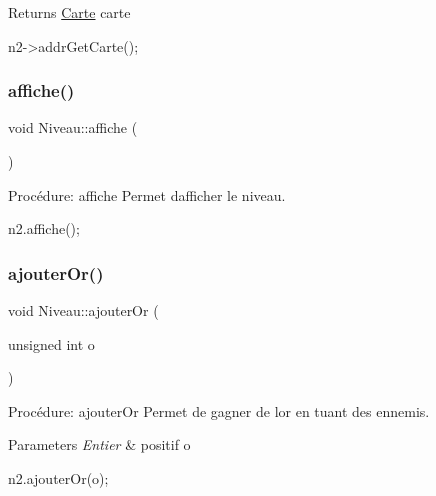 \begin{DoxyReturn}{Returns}
\hyperlink{classCarte}{Carte} carte 
\begin{DoxyCode}
n2->addrGetCarte();
\end{DoxyCode}
 
\end{DoxyReturn}
\mbox{\label{classNiveau_a945a71fd635f9ab1e15dbae04afa5e5d}} 
\subsubsection{\texorpdfstring{affiche()}{affiche()}}
{\footnotesize\ttfamily void Niveau\+::affiche (\begin{DoxyParamCaption}{ }\end{DoxyParamCaption})}



Procédure\+: affiche Permet d\textquotesingle{}afficher le niveau. 


\begin{DoxyCode}
n2.affiche();
\end{DoxyCode}
 \mbox{\label{classNiveau_aca63b4ff95491069ebf5a8931ffc6d03}} 
\subsubsection{\texorpdfstring{ajouter\+Or()}{ajouterOr()}}
{\footnotesize\ttfamily void Niveau\+::ajouter\+Or (\begin{DoxyParamCaption}\item[{unsigned int}]{o }\end{DoxyParamCaption})}



Procédure\+: ajouter\+Or Permet de gagner de l\textquotesingle{}or en tuant des ennemis. 


\begin{DoxyParams}{Parameters}
{\em Entier} & positif o 
\begin{DoxyCode}
n2.ajouterOr(o);
\end{DoxyCode}
 \\
\hline
\end{DoxyParams}
\mbox{\label{classNiveau_a503e0b7db795e1f9bf3ea76cc4fd9e99}} 
